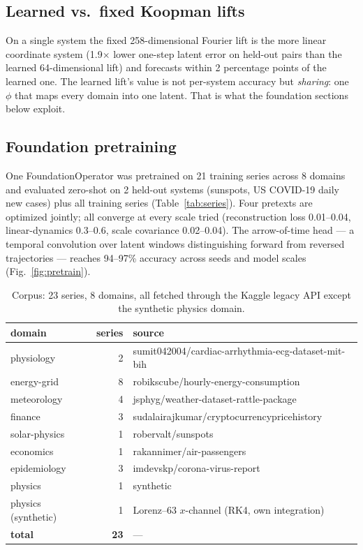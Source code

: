 \documentclass[11pt]{article}
\begin{document}
\subsection{Learned vs.\ fixed Koopman lifts}
\label{sec:deep}
On a single system the fixed 258-dimensional Fourier lift is the more linear
coordinate system (1.9$\times$ lower one-step latent error on held-out pairs
than the learned 64-dimensional lift) and forecasts within 2 percentage
points of the learned one. The learned lift's value is not per-system
accuracy but \emph{sharing}: one $\phi$ that maps every domain into one
latent. That is what the foundation sections below exploit.

\subsection{Foundation pretraining}
\label{sec:foundation}
One FoundationOperator was pretrained on 21 training series across 8 domains
and evaluated zero-shot on 2 held-out systems (sunspots, US COVID-19 daily
new cases) plus all training series (Table~\ref{tab:series}). Four pretexts
are optimized jointly; all converge at every scale tried (reconstruction
loss 0.01--0.04, linear-dynamics 0.3--0.6, scale covariance 0.02--0.04).
The arrow-of-time head --- a temporal convolution over latent windows
distinguishing forward from reversed trajectories --- reaches 94--97\%
accuracy across seeds and model scales (Fig.~\ref{fig:pretrain}).

\begin{table}[h]
\centering\small
\caption{Corpus: 23 series, 8 domains, all fetched through the Kaggle legacy
API except the synthetic physics domain.}
\label{tab:corpus}
\begin{tabular}{lrl}
\toprule
domain & series & source \\
\midrule
physiology & 2 & sumit042004/cardiac-arrhythmia-ecg-dataset-mit-bih\\
energy-grid & 8 & robikscube/hourly-energy-consumption\\
meteorology & 4 & jsphyg/weather-dataset-rattle-package\\
finance & 3 & sudalairajkumar/cryptocurrencypricehistory\\
solar-physics & 1 & robervalt/sunspots\\
economics & 1 & rakannimer/air-passengers\\
epidemiology & 3 & imdevskp/corona-virus-report\\
physics & 1 & synthetic\\
physics (synthetic) & 1 & Lorenz--63 $x$-channel (RK4, own integration)\\
\textbf{total} & \textbf{23} & ---\\
\bottomrule
\end{tabular}
\end{table}
\end{document}
